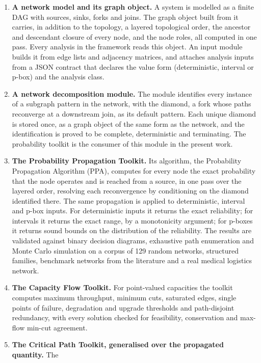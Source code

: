 \documentclass[12pt]{report}
\begin{document}
\begin{enumerate}
  \item \textbf{A network model and its graph object.} A system is modelled as a finite DAG
    with sources, sinks, forks and joins. The graph object built from it carries, in addition
    to the topology, a layered topological order, the ancestor and descendant closure of every
    node, and the node roles, all computed in one pass. Every analysis in the framework reads
    this object. An input module builds it from edge lists and adjacency matrices, and attaches
    analysis inputs from a JSON contract that declares the value form (deterministic, interval
    or p-box) and the analysis class.
  \item \textbf{A network decomposition module.} The module identifies every instance of a
    subgraph pattern in the network, with the diamond, a fork whose paths reconverge at a
    downstream join, as its default pattern. Each unique diamond is stored once, as a graph
    object of the same form as the network, and the identification is proved to be complete,
    deterministic and terminating. The probability toolkit is the consumer of this module in
    the present work.
  \item \textbf{The Probability Propagation Toolkit.} Its algorithm, the Probability
    Propagation Algorithm (PPA), computes for every node the exact probability that the node
    operates and is reached from a source, in one pass over the layered order, resolving each
    reconvergence by conditioning on the diamond identified there. The same propagation is
    applied to deterministic, interval and p-box inputs. For deterministic inputs it returns
    the exact reliability; for intervals it returns the exact range, by a monotonicity
    argument; for p-boxes it returns sound bounds on the distribution of the reliability. The
    results are validated against binary decision diagrams, exhaustive path enumeration and
    Monte Carlo simulation on a corpus of 129 random networks, structured families, benchmark
    networks from the literature and a real medical logistics network.
  \item \textbf{The Capacity Flow Toolkit.} For point-valued capacities the toolkit computes
    maximum throughput, minimum cuts, saturated edges, single points of failure, degradation
    and upgrade thresholds and path-disjoint redundancy, with every solution checked for
    feasibility, conservation and max-flow min-cut agreement.
  \item \textbf{The Critical Path Toolkit, generalised over the propagated quantity.} The

\end{enumerate}
\end{document}
